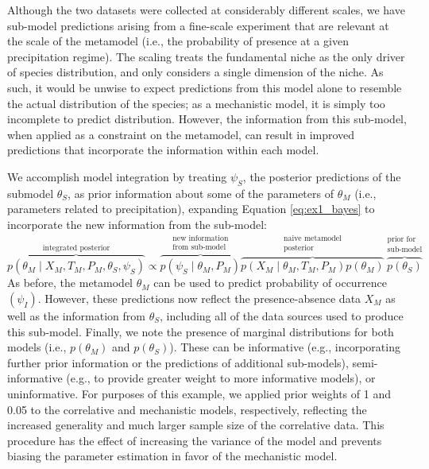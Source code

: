 \documentclass[11pt]{article}
\begin{document}
Although the two datasets were collected at considerably different scales, we have sub-model predictions arising from a fine-scale experiment that are relevant at the scale of the metamodel (i.e., the probability of presence at a given precipitation regime). 
The scaling treats the fundamental niche as the only driver of species distribution, and only considers a single dimension of the niche.
As such, it would be unwise to expect predictions from this model alone to resemble the actual distribution of the species; as a mechanistic model, it is simply too incomplete to predict distribution.
However, the information from this sub-model, when applied as a constraint on the metamodel, can result in improved predictions that incorporate the information within each model.

We accomplish model integration by treating \(\psi_S\), the posterior predictions of the submodel \(\theta_S\), as prior information about some of the parameters of \(\theta_M\) (i.e., parameters related to precipitation), expanding Equation \ref{eq:ex1_bayes} to incorporate the new information from the sub-model:
\begin{equation}
	\label{eq:ex1_integrated}
	\overbrace{p(\theta_M \mid X_M, T_M, P_M, \theta_S, \psi_S)}^\text{integrated posterior}
	\propto
	\overbrace{p\left (\psi_S \mid \theta_M,P_M \right )}^{\substack{\text{new information} \\ \text{from sub-model}}}
	\overbrace{p \left(X_M \mid \theta_M, T_M, P_M \right) p \left(\theta_M \right)}^{\substack{\text{naive metamodel} \\ \text{posterior}}}
	\overbrace{p \left(\theta_S \right)}^{\substack{\text{prior for} \\ \text{sub-model}}}	
\end{equation}
As before, the metamodel \(\theta_M\) can be used to predict probability of occurrence \((\psi_I)\).
However, these predictions now reflect the presence-absence data \(X_M\) as well as the information from \(\theta_S\), including all of the data sources used to produce this sub-model.
Finally, we note the presence of marginal distributions for both models (i.e., \(p(\theta_M)\) and \(p(\theta_S)\)).
These can be informative (e.g., incorporating further prior information or the predictions of additional sub-models), semi-informative (e.g., to provide greater weight to more informative models), or uninformative.
For purposes of this example, we applied prior weights of 1 and 0.05 to the correlative and mechanistic models, respectively, reflecting the increased generality and much larger sample size of the correlative data.
This procedure has the effect of increasing the variance of the model and prevents biasing the parameter estimation in favor of the mechanistic model.
\end{document}
